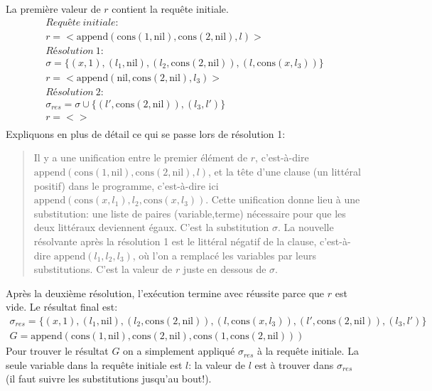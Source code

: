 La première valeur de $r$ contient la requête initiale.
\begin{equation}
\begin{array}{l}
\mathit{Requête\ initiale:} \\
r = < \mathrm{append}(\mathrm{cons}(1,\mathrm{nil}), \mathrm{cons}(2,\mathrm{nil}), l)> \\
\mathit{Résolution\ 1:} \\
\sigma = \{(x,1), (l_1,\mathrm{nil}), (l_2,\mathrm{cons}(2,\mathrm{nil})), (l,\mathrm{cons}(x,l_3))\} \\
r = < \mathrm{append}(\mathrm{nil}, \mathrm{cons}(2,\mathrm{nil}), l_3) > \\
\mathit{Résolution\ 2:} \\
\sigma_{res} = \sigma \cup \{ (l',\mathrm{cons}(2,\mathrm{nil})), (l_3,l') \} \\
r = < > \\
\end{array}
\end{equation}
Expliquons en plus de détail ce qui se passe lors de résolution 1:
\begin{quote}
Il y a une unification entre le premier élément de $r$,
c'est-à-dire $\mathrm{append}(\mathrm{cons}(1,\mathrm{nil}), \mathrm{cons}(2,\mathrm{nil}), l)$,
et la tête d'une clause (un littéral positif) dans le programme,
c'est-à-dire ici $\mathrm{append}(\mathrm{cons}(x,l_1),l_2,\mathrm{cons}(x,l_3))$.
Cette unification donne lieu à une substitution: une liste de paires (variable,terme)
nécessaire pour que les deux littéraux deviennent égaux.
C'est la substitution $\sigma$.
La nouvelle résolvante après la résolution 1 est le littéral négatif de la clause,
c'est-à-dire $\mathrm{append}(l_1,l_2,l_3)$, où l'on a remplacé les variables par leurs substitutions.
C'est la valeur de $r$ juste en dessous de $\sigma$.
\end{quote}
Après la deuxième résolution,
l'exécution termine avec réussite parce que $r$ est vide.
Le résultat final est:
\begin{equation}
\begin{array}{l}
\sigma_{res} = \{(x,1), (l_1,\mathrm{nil}), (l_2,\mathrm{cons}(2,\mathrm{nil})), (l,\mathrm{cons}(x,l_3)), (l',\mathrm{cons}(2,\mathrm{nil})), (l_3,l') \} \\
G = \mathrm{append}(\mathrm{cons}(1,\mathrm{nil}), \mathrm{cons}(2,\mathrm{nil}), \mathrm{cons}(1,\mathrm{cons}(2,\mathrm{nil})))
\end{array}
\end{equation}
Pour trouver le résultat $G$ on a simplement appliqué $\sigma_{res}$ à la requête initiale.
La seule variable dans la requête initiale est $l$: la valeur de $l$ est à trouver dans $\sigma_{res}$
(il faut suivre les substitutions jusqu'au bout!).

